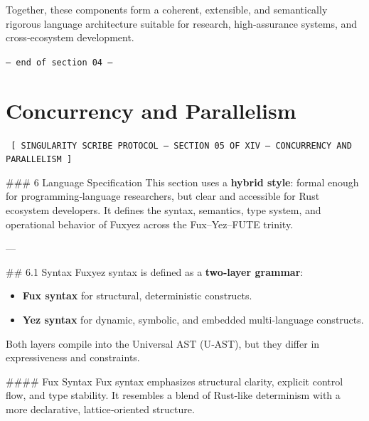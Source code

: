\documentclass[12pt, a4paper]{book}
\begin{document}
Together, these components form a coherent, extensible, and semantically rigorous language architecture suitable for research, high‑assurance systems, and cross‑ecosystem development.
    
    \vspace{1cm}
    \begin{center}
    \color{alienPurple}\texttt{--- end of section 04 ---}
    \end{center}
    \clearpage
    

    \chapter*{Concurrency and Parallelism}
    
    
    \begin{glyphbox}
    \centering
    \color{neonCyan}\fontsize{8}{10}\selectfont\texttt{
    [ SINGULARITY SCRIBE PROTOCOL -- SECTION 05 OF XIV -- CONCURRENCY AND PARALLELISM ]
    }
    \end{glyphbox}
    \vspace{0.3cm}
    
    
    \#\#\# 6 Language Specification  
This section uses a \textbf{hybrid style}: formal enough for programming‑language researchers, but clear and accessible for Rust ecosystem developers. It defines the syntax, semantics, type system, and operational behavior of Fuxyez across the Fux–Yez–FUTE trinity.

---

\#\# 6.1 Syntax  
Fuxyez syntax is defined as a \textbf{two‑layer grammar}:  
\begin{itemize}
  \item \textbf{Fux syntax} for structural, deterministic constructs.  
  \item \textbf{Yez syntax} for dynamic, symbolic, and embedded multi‑language constructs.
\end{itemize}

Both layers compile into the Universal AST (U‑AST), but they differ in expressiveness and constraints.

\#\#\#\# Fux Syntax  
Fux syntax emphasizes structural clarity, explicit control flow, and type stability. It resembles a blend of Rust‑like determinism with a more declarative, lattice‑oriented structure.
\end{document}
